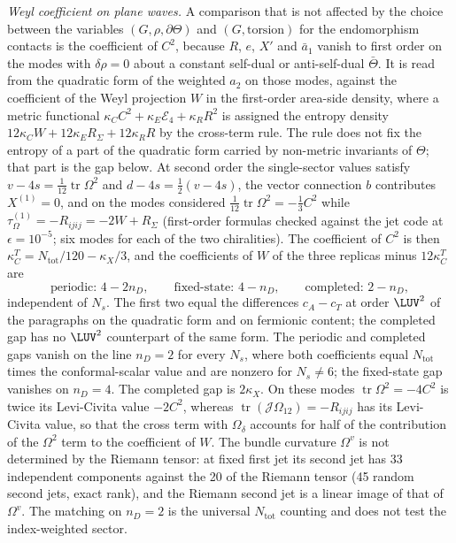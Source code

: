 \emph{Weyl coefficient on plane waves.} A comparison that is not affected by the choice between the variables \((G,\rho,\partial\Theta)\) and \((G,\text{torsion})\) for the endomorphism contacts is the coefficient of \(C^2\), because \(R\), \(e\), \(X'\) and \(\bar a_1\) vanish to first order on the modes with \(\delta\rho=0\) about a constant self-dual or anti-self-dual \(\bar\Theta\). It is read from the quadratic form of the weighted \(a_2\) on those modes, against the coefficient of the Weyl projection \(W\) in the first-order area-side density, where a metric functional \(\kappa_CC^2+\kappa_E\mathcal E_4+\kappa_RR^2\) is assigned the entropy density \(12\kappa_CW+12\kappa_ER_\Sigma+12\kappa_RR\) by the cross-term rule. The rule does not fix the entropy of a part of the quadratic form carried by non-metric invariants of \(\Theta\); that part is the gap below. At second order the single-sector values satisfy \(v-4s=\tfrac1{12}\operatorname{tr}\Omega^2\) and \(d-4s=\tfrac12(v-4s)\), the vector connection \(b\) contributes \(X^{(1)}=0\), and on the modes considered \(\tfrac1{12}\operatorname{tr}\Omega^2=-\tfrac13C^2\) while \(\tau_\Omega^{(1)}=-R_{ijij}=-2W+R_\Sigma\) (first-order formulas checked against the jet code at \(\epsilon=10^{-5}\); six modes for each of the two chiralities). The coefficient of \(C^2\) is then \(\kappa_C^T=N_{\mathrm{tot}}/120-\kappa_X/3\), and the coefficients of \(W\) of the three replicas minus \(12\kappa_C^T\) are
\[
  \text{periodic: }4-2n_D,\qquad \text{fixed-state: }4-n_D,\qquad \text{completed: }2-n_D,
\]
independent of \(N_s\). The first two equal the differences \(c_A-c_T\) at order \(\LUV^2\) of the paragraphs on the quadratic form and on fermionic content; the completed gap has no \(\LUV^2\) counterpart of the same form. The periodic and completed gaps vanish on the line \(n_D=2\) for every \(N_s\), where both coefficients equal \(N_{\mathrm{tot}}\) times the conformal-scalar value and are nonzero for \(N_s\neq6\); the fixed-state gap vanishes on \(n_D=4\). The completed gap is \(2\kappa_X\). On these modes \(\operatorname{tr}\Omega^2=-4C^2\) is twice its Levi-Civita value \(-2C^2\), whereas \(\operatorname{tr}(\mathcal J\Omega_{12})=-R_{ijij}\) has its Levi-Civita value, so that the cross term with \(\Omega_\delta\) accounts for half of the contribution of the \(\Omega^2\) term to the coefficient of \(W\). The bundle curvature \(\Omega^v\) is not determined by the Riemann tensor: at fixed first jet its second jet has 33 independent components against the 20 of the Riemann tensor (45 random second jets, exact rank), and the Riemann second jet is a linear image of that of \(\Omega^v\). The matching on \(n_D=2\) is the universal \(N_{\mathrm{tot}}\) counting and does not test the index-weighted sector.


